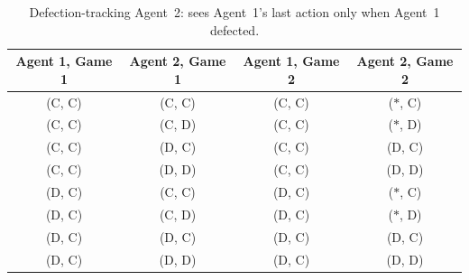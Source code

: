 \documentclass{article}
\begin{document}
\begin{table}[h!]
  \caption{Defection-tracking Agent~2: sees Agent~1's last action only when Agent~1 defected.}
  \label{tab:exp-def}
  \centering
  \begin{tabular}{cccc}
    \toprule
    Agent 1, Game 1 & Agent 2, Game 1 & Agent 1, Game 2 & Agent 2, Game 2 \\
    \midrule
    (C, C) & (C, C) & (C, C) & ($*$, C) \\
    (C, C) & (C, D) & (C, C) & ($*$, D) \\
    (C, C) & (D, C) & (C, C) & (D, C) \\
    (C, C) & (D, D) & (C, C) & (D, D) \\
    (D, C) & (C, C) & (D, C) & ($*$, C) \\
    (D, C) & (C, D) & (D, C) & ($*$, D) \\
    (D, C) & (D, C) & (D, C) & (D, C) \\
    (D, C) & (D, D) & (D, C) & (D, D) \\
    \bottomrule
  \end{tabular}
\end{table}
\end{document}
